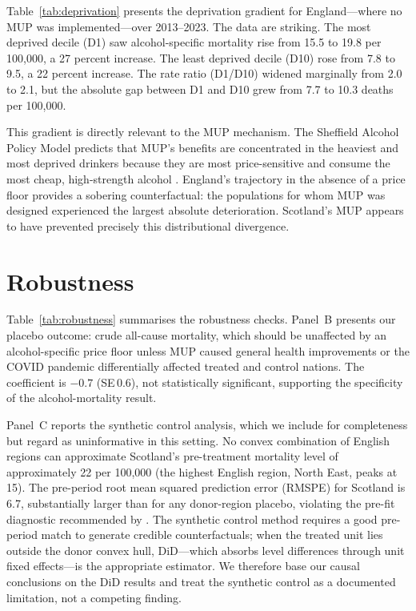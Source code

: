 \documentclass[12pt]{article}
\begin{document}
Table~\ref{tab:deprivation} presents the deprivation gradient for England---where no MUP was implemented---over 2013--2023. The data are striking. The most deprived decile (D1) saw alcohol-specific mortality rise from 15.5 to 19.8 per 100,000, a 27 percent increase. The least deprived decile (D10) rose from 7.8 to 9.5, a 22 percent increase. The rate ratio (D1/D10) widened marginally from 2.0 to 2.1, but the absolute gap between D1 and D10 grew from 7.7 to 10.3 deaths per 100,000.

This gradient is directly relevant to the MUP mechanism. The Sheffield Alcohol Policy Model predicts that MUP's benefits are concentrated in the heaviest and most deprived drinkers because they are most price-sensitive and consume the most cheap, high-strength alcohol \citep{Holmes2014,Meng2014}. England's trajectory in the absence of a price floor provides a sobering counterfactual: the populations for whom MUP was designed experienced the largest absolute deterioration. Scotland's MUP appears to have prevented precisely this distributional divergence.



\section{Robustness}
\label{sec:robustness}

Table~\ref{tab:robustness} summarises the robustness checks. Panel~B presents our placebo outcome: crude all-cause mortality, which should be unaffected by an alcohol-specific price floor unless MUP caused general health improvements or the COVID pandemic differentially affected treated and control nations. The coefficient is $-0.7$ (SE\,0.6), not statistically significant, supporting the specificity of the alcohol-mortality result.

Panel~C reports the synthetic control analysis, which we include for completeness but regard as uninformative in this setting. No convex combination of English regions can approximate Scotland's pre-treatment mortality level of approximately 22 per 100,000 (the highest English region, North East, peaks at 15). The pre-period root mean squared prediction error (RMSPE) for Scotland is 6.7, substantially larger than for any donor-region placebo, violating the pre-fit diagnostic recommended by \citet{Abadie2021}. The synthetic control method requires a good pre-period match to generate credible counterfactuals; when the treated unit lies outside the donor convex hull, DiD---which absorbs level differences through unit fixed effects---is the appropriate estimator. We therefore base our causal conclusions on the DiD results and treat the synthetic control as a documented limitation, not a competing finding.
\end{document}
